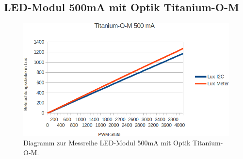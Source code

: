 \documentclass[a4paper,12pt]{scrartcl}
\begin{document}

\subsection{LED-Modul 500mA mit Optik Titanium-O-M}

\begin{figure}[H]
  \begin{center}
    \includegraphics[width=1\hsize]{./images/500-m-print.png}
  \end{center}
\caption[Diagramm zur Messreihe LED-Modul 500mA mit Optik Titanium-O-M]{\label{diagram500matitm}Diagramm zur Messreihe LED-Modul 500mA mit Optik
Titanium-O-M.}
\end{figure}
\end{document}
